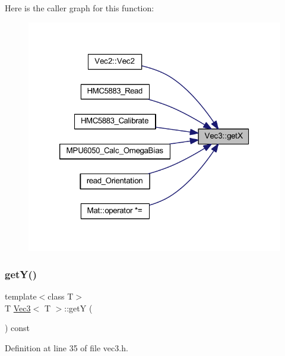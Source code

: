 Here is the caller graph for this function\+:
\nopagebreak
\begin{figure}[H]
\begin{center}
\leavevmode
\includegraphics[width=320pt]{class_vec3_ad259e243f6678730d990acbae2cdff57_icgraph}
\end{center}
\end{figure}
\mbox{\label{class_vec3_a8eeb16262b7e619f081a1ba94df098f8}} 
\subsubsection{\texorpdfstring{getY()}{getY()}}
{\footnotesize\ttfamily template$<$class T$>$ \\
T \mbox{\hyperlink{class_vec3}{Vec3}}$<$ T $>$\+::getY (\begin{DoxyParamCaption}{ }\end{DoxyParamCaption}) const\hspace{0.3cm}{\ttfamily [inline]}}



Definition at line 35 of file vec3.\+h.

